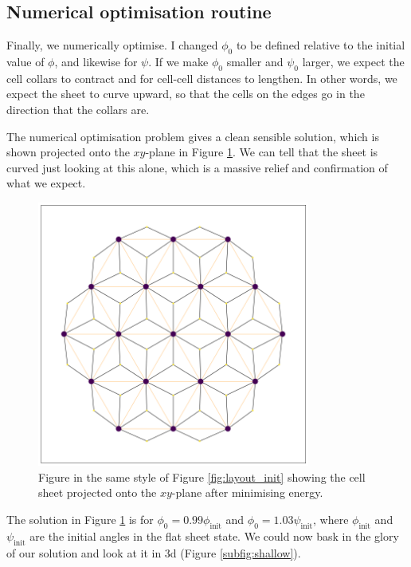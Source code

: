 \documentclass[draft]{article}
\begin{document}
\subsection{Numerical optimisation routine}

Finally, we numerically optimise. I changed $\phi_0$ to be defined relative to the initial value of $\phi$, and likewise for $\psi$. If we make $\phi_0$ smaller and $\psi_0$ larger, we expect the cell collars to contract and for cell-cell distances to lengthen. In other words, we expect the sheet to curve upward, so that the cells on the edges go in the direction that the collars are.

The numerical optimisation problem gives a clean sensible solution, which is shown projected onto the $xy$-plane in Figure \ref{fig:layout_curved}. We can tell that the sheet is curved just looking at this alone, which is a massive relief and confirmation of what we expect.

\begin{figure}[htbp]
    \centering
    \includegraphics[width=0.8\textwidth]{figures/numerical/layout_curved.png}
    \caption{Figure in the same style of Figure \ref{fig:layout_init} showing the cell sheet projected onto the $xy$-plane after minimising energy. }
    \label{fig:layout_curved}
\end{figure}

The solution in Figure \ref{fig:layout_curved} is for $\phi_0 = 0.99 \phi_{\text{init}}$ and $\phi_0 = 1.03 \psi_{\text{init}}$, where $\phi_{\text{init}}$ and $\psi_{\text{init}}$ are the initial angles in the flat sheet state. We could now bask in the glory of our solution and look at it in 3d (Figure \ref{subfig:shallow}).
\end{document}
